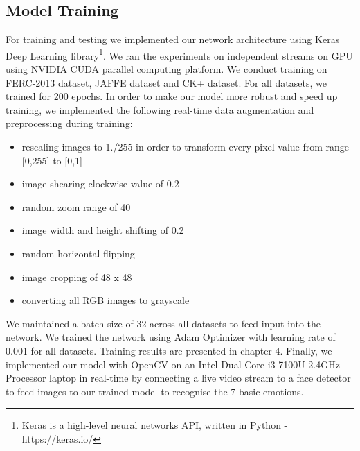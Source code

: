 \documentclass[master]{thesis-uestc}
\begin{document}
\subsection{Model Training}
For training and testing we implemented our network architecture using Keras Deep Learning library\footnote{Keras is a high-level neural networks API, written in Python - https://keras.io/}. We ran the experiments on independent streams on GPU using NVIDIA CUDA parallel computing platform. We conduct training on FERC-2013 dataset, JAFFE dataset and CK+ dataset. For all datasets, we trained for 200 epochs. In order to make our model more robust and speed up training, we implemented the following real-time data augmentation and preprocessing during training:
\begin{itemize}
 \item rescaling images to 1./255 in order to transform every pixel value from range [0,255] to [0,1]
 \item image shearing clockwise value of 0.2
 \item  random zoom range of 40
 \item  image width and height shifting of 0.2
 \item random horizontal flipping
 \item image cropping of 48 x 48
 \item converting all RGB images to grayscale
\end{itemize}
We maintained a batch size of 32 across all datasets to feed input into the network. We trained the network using Adam Optimizer \cite{DBLP:journals/corr/KingmaB14} with learning rate of 0.001 for all datasets. Training results are presented in chapter 4. Finally, we implemented our model with OpenCV on an Intel Dual Core i3-7100U 2.4GHz Processor laptop in real-time by connecting a live video stream to a face detector to feed images to our trained model to recognise the 7 basic emotions.
\end{document}
